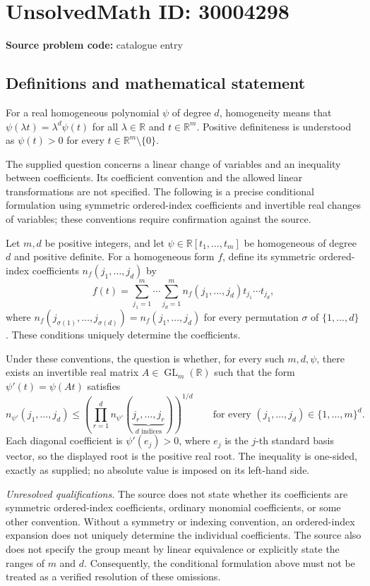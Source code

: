 \documentclass[11pt]{article}
\newcommand{\R}{\mathbb{R}}
\begin{document}
\section*{UnsolvedMath ID: 30004298}
\textbf{Source problem code:} catalogue entry
\subsection{Definitions and mathematical statement}
For a real homogeneous polynomial \(\psi\) of degree \(d\), homogeneity means that \(\psi(\lambda t)=\lambda^d\psi(t)\) for all \(\lambda\in\R\) and \(t\in\R^m\). Positive definiteness is understood as \(\psi(t)>0\) for every \(t\in\R^m\setminus\{0\}\).

The supplied question concerns a linear change of variables and an inequality between coefficients. Its coefficient convention and the allowed linear transformations are not specified. The following is a precise conditional formulation using symmetric ordered-index coefficients and invertible real changes of variables; these conventions require confirmation against the source.

Let \(m,d\) be positive integers, and let \(\psi\in\R[t_1,\ldots,t_m]\) be homogeneous of degree \(d\) and positive definite. For a homogeneous form \(f\), define its symmetric ordered-index coefficients \(n_f(j_1,\ldots,j_d)\) by
\[
f(t)=\sum_{j_1=1}^{m}\cdots\sum_{j_d=1}^{m}n_f(j_1,\ldots,j_d)t_{j_1}\cdots t_{j_d},
\]
where \(n_f(j_{\sigma(1)},\ldots,j_{\sigma(d)})=n_f(j_1,\ldots,j_d)\) for every permutation \(\sigma\) of \(\{1,\ldots,d\}\). These conditions uniquely determine the coefficients.

Under these conventions, the question is whether, for every such \(m,d,\psi\), there exists an invertible real matrix \(A\in\operatorname{GL}_m(\R)\) such that the form \(\psi'(t)=\psi(At)\) satisfies
\[
n_{\psi'}(j_1,\ldots,j_d)
\leq
\left(\prod_{r=1}^{d}n_{\psi'}(\underbrace{j_r,\ldots,j_r}_{d\text{ indices}})\right)^{1/d}
\qquad\text{for every }(j_1,\ldots,j_d)\in\{1,\ldots,m\}^{d}.
\]
Each diagonal coefficient is \(\psi'(e_j)>0\), where \(e_j\) is the \(j\)-th standard basis vector, so the displayed root is the positive real root. The inequality is one-sided, exactly as supplied; no absolute value is imposed on its left-hand side.

\textit{Unresolved qualifications.} The source does not state whether its coefficients are symmetric ordered-index coefficients, ordinary monomial coefficients, or some other convention. Without a symmetry or indexing convention, an ordered-index expansion does not uniquely determine the individual coefficients. The source also does not specify the group meant by linear equivalence or explicitly state the ranges of \(m\) and \(d\). Consequently, the conditional formulation above must not be treated as a verified resolution of these omissions.
\end{document}
